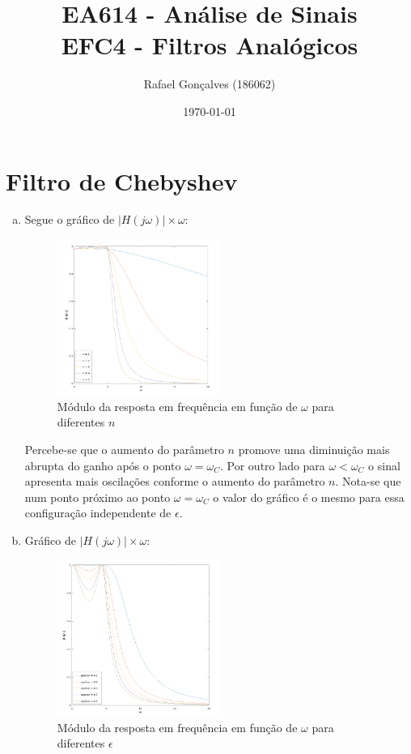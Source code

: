 \documentclass{article}
\begin{document}
\title{EA614 - Análise de Sinais \\
\large{EFC4 - Filtros Analógicos}}
\author{Rafael Gonçalves (186062)}
\date{\today}

\maketitle

\section{Filtro de Chebyshev}

\begin{enumerate}[(a)]
\item
    Segue o gráfico de $|H(j\omega)| \times \omega$:
 \begin{figure}[H]
 \centering
 \includegraphics[width=0.5\textwidth]{images/hc_n.png}
     \caption{Módulo da resposta em frequência em função de $\omega$ para diferentes $n$}
 \end{figure}

        Percebe-se que o aumento do parâmetro $n$ promove uma diminuição mais abrupta do ganho após o ponto $\omega = \omega_C$. Por outro lado para $\omega < \omega_C$ o sinal apresenta mais oscilações conforme o aumento do parâmetro $n$. Nota-se que num ponto próximo ao ponto $\omega = \omega_C$ o valor do gráfico é o mesmo para essa configuração independente de $\epsilon$.

\break\vfill

\item
    Gráfico de $|H(j\omega)| \times \omega$:
 \begin{figure}[H]
 \centering
 \includegraphics[width=0.5\textwidth]{images/hc_epsilon.png}
     \caption{Módulo da resposta em frequência em função de $\omega$ para diferentes $\epsilon$}
 \end{figure}


\end{enumerate}
\end{document}

